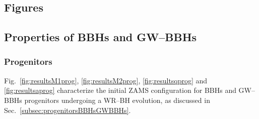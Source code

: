 \documentclass[a4paper,titlepage]{book}     	%
\begin{document}
\begin{appendices}

\chapter{Figures}\label{app:figures}
\section{Properties of BBHs and GW--BBHs}\label{subapp:BBHandGWBBHproperties}
\subsection{Progenitors}\label{subapp:progenitorsGWBBH}
Fig.\ \ref{fig:resultsM1prog}, \ref{fig:resultsM2prog}, \ref{fig:resultsqprog} and \ref{fig:resultsaprog} characterize the initial ZAMS configuration for BBHs and GW--BBHs progenitors undergoing a WR--BH evolution, as discussed in Sec.\ \ref{subsec:progenitorsBBHsGWBBHs}.


\end{appendices}
\end{document}
